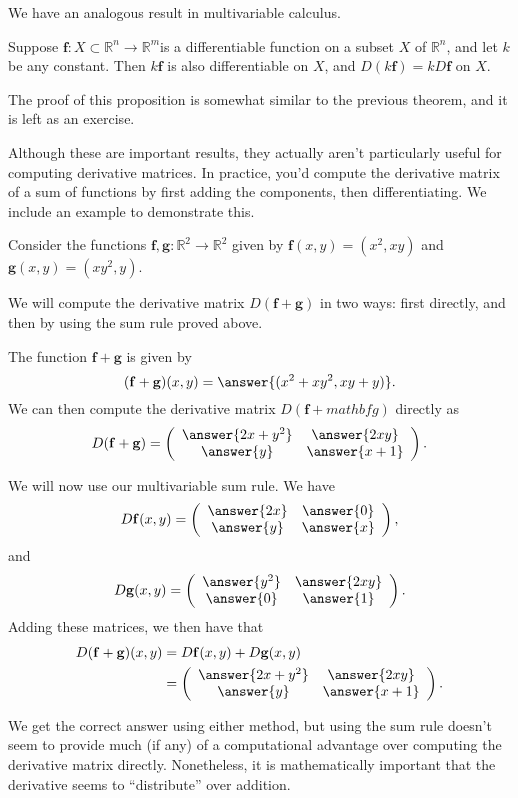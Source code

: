\documentclass{ximera}
\begin{document}
We have an analogous result in multivariable calculus.

\begin{proposition}
Suppose $\mathbf{f}:X\subset \mathbb{R}^n\rightarrow \mathbb{R}^m$is a differentiable function on a subset $X$ of $\mathbb{R}^n$, and let $k$ be any constant. Then $k\mathbf{f}$ is also differentiable on $X$, and $D(k\mathbf{f})=kD\mathbf{f}$ on $X$.
\end{proposition}

The proof of this proposition is somewhat similar to the previous theorem, and it is left as an exercise.

Although these are important results, they actually aren't particularly useful for computing derivative matrices. In practice, you'd compute the derivative matrix of a sum of functions by first adding the components, then differentiating. We include an example to demonstrate this.

\begin{example}
Consider the functions $\mathbf{f},\mathbf{g}:\mathbb{R}^2\rightarrow\mathbb{R}^2$ given by $\mathbf{f}(x,y) = (x^2, xy)$ and $\mathbf{g}(x,y) = (xy^2, y)$.

We will compute the derivative matrix $D(\mathbf{f}+\mathbf{g})$ in two ways: first directly, and then by using the sum rule proved above.

The function $\mathbf{f}+\mathbf{g}$ is given by
\[
(\mathbf{f}+\mathbf{g})(x,y) = \answer{(x^2+xy^2, xy+y)}.
\]
We can then compute the derivative matrix $D(\mathbf{f}+mathbf{g})$ directly as 
\[
D(\mathbf{f}+\mathbf{g})=\left(\begin{array}{cc} \answer{2x+y^2} & \answer{2xy}\\\answer{y} & \answer{x+1}\end{array}\right).
\]

We will now use our multivariable sum rule.
We have
\[
D\mathbf{f}(x,y) = \left(\begin{array}{cc} \answer{2x} & \answer{0}\\\answer{y} & \answer{x}\end{array}\right),
\]
and 
\[
D\mathbf{g}(x,y) = \left(\begin{array}{cc} \answer{y^2} & \answer{2xy}\\\answer{0} & \answer{1}\end{array}\right).
\]
Adding these matrices, we then have that
\begin{align*}
D(\mathbf{f}+\mathbf{g})(x,y) &= D\mathbf{f}(x,y)+D\mathbf{g}(x,y)\\
&= \left(\begin{array}{cc} \answer{2x+y^2} & \answer{2xy}\\\answer{y} & \answer{x+1}\end{array}\right).
\end{align*}

We get the correct answer using either method, but using the sum rule doesn't seem to provide much (if any) of a computational advantage over computing the derivative matrix directly. Nonetheless, it is mathematically important that the derivative seems to ``distribute'' over addition.
\end{example}
\end{document}
